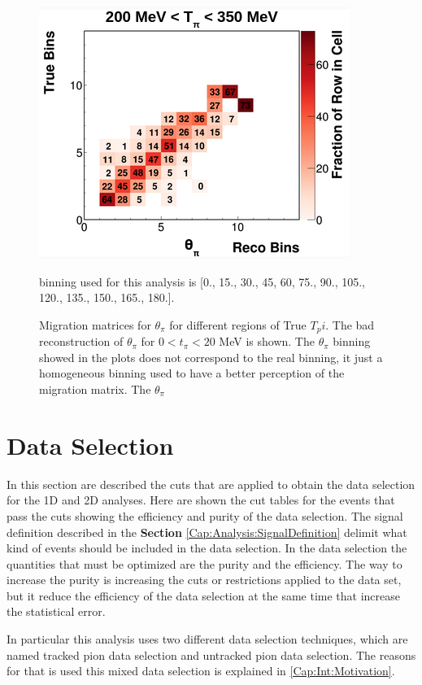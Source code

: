 \begin{figure}[!htb]
    \includegraphics[scale=0.33]{Figures/Chapter4/SignalDefinition/thetapi200to350tpi.png}
    \caption{Migration matrices for $\theta_\pi$ for different regions of True $T_pi$. The bad reconstruction of $\theta_\pi$ for $0<t_\pi<20$ MeV is shown. The $\theta_\pi$ binning showed in the plots does not correspond to the real binning, it just a homogeneous binning used to have a better perception of the migration matrix. The $\theta_\pi$} binning used for this analysis is [0., 15., 30., 45, 60, 75., 90., 105., 120., 135., 150., 165., 180.].
    \label{fig:Analysis:SignalDefinition:1DAnalysis:thetapivsTpi}
\end{figure}


\section{Data Selection}
\label{Cap:Analysis:DataSelection}

In this section are described the cuts that are applied to obtain the data selection for the 1D and 2D analyses. Here are shown the cut tables for the events that pass the cuts showing the efficiency and purity of the data selection. The signal definition described in the \textbf{Section} \ref{Cap:Analysis:SignalDefinition} delimit what kind of events should be included in the data selection. In the data selection the quantities that must be optimized are the purity and the efficiency. The way to increase the purity is increasing the cuts or restrictions applied to the data set, but it reduce the efficiency of the data selection at the same time that increase the statistical error. 

In particular this analysis uses two different data selection techniques, which are named tracked pion data selection and untracked pion data selection. The reasons for that is used this mixed data selection is explained in \ref{Cap:Int:Motivation}.


